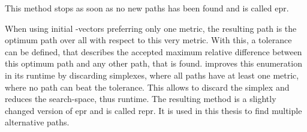     This method stops as soon as no new paths has been found and is called \gls{epr}.

    When using initial \alpha-vectors preferring only one \gls{metric}, the resulting path is the optimum path over all \alpha with respect to this very \gls{metric}.
    With this, a tolerance can be defined, that describes the accepted maximum relative difference between this optimum path and any other path, that is found.
    \cite{barth:alternative_routes} improves this enumeration in its runtime by discarding simplexes, where all paths have at least one \gls{metric}, where no path can beat the tolerance.
    This allows to discard the simplex and reduces the search-space, thus runtime.
    The resulting method is a slightly changed version of \gls{epr} and is called \gls{repr}.
    It is used in this thesis to find multiple alternative paths.